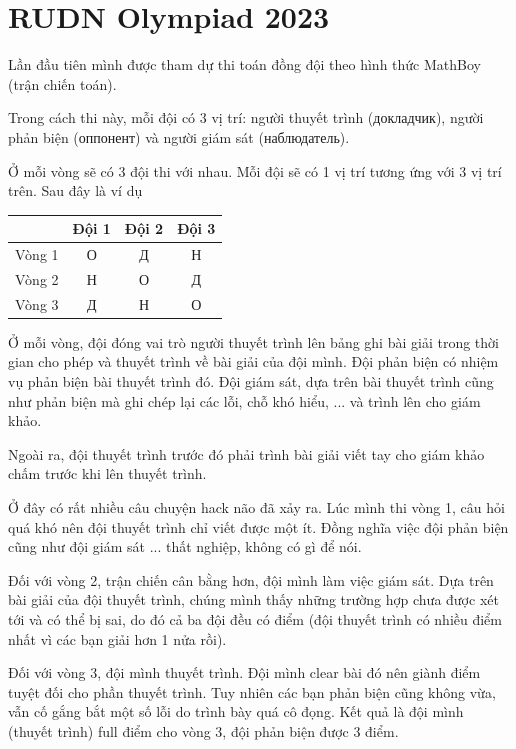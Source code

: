 \section{RUDN Olympiad 2023}

Lần đầu tiên mình được tham dự thi toán đồng đội theo hình thức MathBoy (trận chiến toán).

Trong cách thi này, mỗi đội có 3 vị trí: người thuyết trình (докладчик), người phản biện (оппонент) và người giám sát (наблюдатель).

Ở mỗi vòng sẽ có 3 đội thi với nhau. Mỗi đội sẽ có 1 vị trí tương ứng với 3 vị trí trên. Sau đây là ví dụ

\begin{table}[ht]
    \centering
    \begin{tabular}{|c|c|c|c|}
        \hline
        & Đội 1 & Đội 2 & Đội 3 \\ \hline
        Vòng 1 & О & Д & Н \\ \hline
        Vòng 2 & Н & О & Д \\ \hline
        Vòng 3 & Д & Н & О \\ \hline
    \end{tabular}
\end{table}

Ở mỗi vòng, đội đóng vai trò người thuyết trình lên bảng ghi bài giải trong thời gian cho phép và thuyết trình về bài giải của đội mình. Đội phản biện có nhiệm vụ phản biện bài thuyết trình đó. Đội giám sát, dựa trên bài thuyết trình cũng như phản biện mà ghi chép lại các lỗi, chỗ khó hiểu, ... và trình lên cho giám khảo.

Ngoài ra, đội thuyết trình trước đó phải trình bài giải viết tay cho giám khảo chấm trước khi lên thuyết trình.

Ở đây có rất nhiều câu chuyện hack não đã xảy ra. Lúc mình thi vòng 1, câu hỏi quá khó nên đội thuyết trình chỉ viết được một ít. Đồng nghĩa việc đội phản biện cũng như đội giám sát ... thất nghiệp, không có gì để nói.

Đối với vòng 2, trận chiến cân bằng hơn, đội mình làm việc giám sát. Dựa trên bài giải của đội thuyết trình, chúng mình thấy những trường hợp chưa được xét tới và có thể bị sai, do đó cả ba đội đều có điểm (đội thuyết trình có nhiều điểm nhất vì các bạn giải hơn 1 nửa rồi).

Đối với vòng 3, đội mình thuyết trình. Đội mình clear bài đó nên giành điểm tuyệt đối cho phần thuyết trình. Tuy nhiên các bạn phản biện cũng không vừa, vẫn cố gắng bắt một số lỗi do trình bày quá cô đọng. Kết quả là đội mình (thuyết trình) full điểm cho vòng 3, đội phản biện được 3 điểm.

